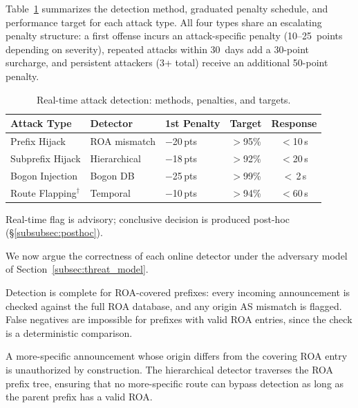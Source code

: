 \documentclass[conference]{IEEEtran}
\newcommand{\BfPara}[1]{\vspace{1mm}{\noindent\textbf{#1.}}\xspace}
\begin{document}
Table~\ref{tab:attack_detection_mechanisms} summarizes the detection method, graduated penalty schedule, and performance target for each attack type. All four types share an escalating penalty structure: a first offense incurs an attack-specific penalty (10--25~points depending on severity), repeated attacks within 30~days add a 30-point surcharge, and persistent attackers (3+ total) receive an additional 50-point penalty.

\begin{table}[t]
\centering
\caption{Real-time attack detection: methods, penalties, and targets.}
\label{tab:attack_detection_mechanisms}
\setlength{\tabcolsep}{5pt}
\footnotesize
\begin{tabular}{lllcc}
\toprule
\textbf{Attack Type} & \textbf{Detector} & \textbf{1st Penalty} & \textbf{Target} & \textbf{Response} \\
\midrule
Prefix Hijack    & ROA mismatch  & $-$20\,pts & $>$95\% & $<$10\,s \\
Subprefix Hijack & Hierarchical  & $-$18\,pts & $>$92\% & $<$20\,s \\
Bogon Injection  & Bogon DB      & $-$25\,pts & $>$99\% & $<$\,2\,s \\
Route Flapping$^{\dagger}$  & Temporal      & $-$10\,pts & $>$94\% & $<$60\,s \\
\bottomrule
\end{tabular}
\begin{tablenotes}
\footnotesize
\item[$\dagger$] Real-time flag is advisory; conclusive decision is produced post-hoc (\S\ref{subsubsec:posthoc}).
\end{tablenotes}
\end{table}

We now argue the correctness of each online detector under the adversary model of Section~\ref{subsec:threat_model}.

\BfPara{Prefix hijack} Detection is complete for ROA-covered prefixes: every incoming announcement is checked against the full ROA database, and any origin AS mismatch is flagged. False negatives are impossible for prefixes with valid ROA entries, since the check is a deterministic comparison.

\BfPara{Subprefix hijack} A more-specific announcement whose origin differs from the covering ROA entry is unauthorized by construction. The hierarchical detector traverses the ROA prefix tree, ensuring that no more-specific route can bypass detection as long as the parent prefix has a valid ROA.
\end{document}
